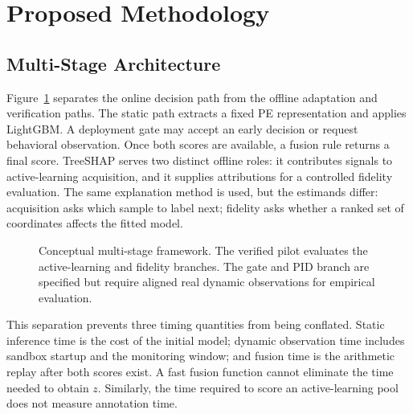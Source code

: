 \section{Proposed Methodology}
\label{sec:method}

\subsection{Multi-Stage Architecture}

Figure~\ref{fig:architecture} separates the online decision path from the
offline adaptation and verification paths. The static path extracts a fixed PE
representation and applies LightGBM. A deployment gate may accept an early
decision or request behavioral observation. Once both scores are available, a
fusion rule returns a final score. TreeSHAP serves two distinct offline roles:
it contributes signals to active-learning acquisition, and it supplies
attributions for a controlled fidelity evaluation. The same explanation method
is used, but the estimands differ: acquisition asks which sample to label next;
fidelity asks whether a ranked set of coordinates affects the fitted model.

\begin{figure}[t]
\centering
{}
\caption{Conceptual multi-stage framework. The verified pilot evaluates the
active-learning and fidelity branches. The gate and PID branch are specified but
require aligned real dynamic observations for empirical evaluation.}
\label{fig:architecture}
\end{figure}

This separation prevents three timing quantities from being conflated. Static
inference time is the cost of the initial model; dynamic observation time includes
sandbox startup and the monitoring window; and fusion time is the arithmetic
replay after both scores exist. A fast fusion function cannot eliminate the time
needed to obtain $z$. Similarly, the time required to score an active-learning
pool does not measure annotation time.

